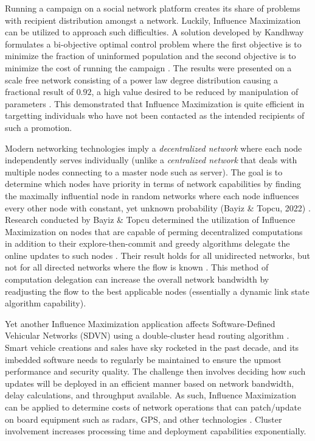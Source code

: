 \documentclass[12pt]{article}
\begin{document}
Running a campaign on a social network platform creates its share of problems with recipient distribution amongst a network. 
Luckily, Influence Maximization can be utilized to approach such difficulties. 
A solution developed by Kandhway formulates a bi-objective optimal control problem where the first objective is to minimize the fraction of uninformed population and the second objective is to minimize the cost of running the campaign \cite{10035644}. 
The results were presented on a scale free network consisting of a power law degree distribution causing a fractional result of $0.92$, a high value desired to be reduced by manipulation of parameters \cite{10035644}. 
This demonstrated that Influence Maximization is quite efficient in targetting individuals who have not been contacted as the intended recipients of such a promotion.

Modern networking technologies imply a \emph{decentralized network} where each node independently serves individually (unlike a \emph{centralized network} that deals with multiple nodes connecting to a master node such as server). 
The goal is to determine which nodes have priority in terms of network capabilities by finding the maximally influential node in random networks where each node influences every other node with constant, yet unknown probability (Bayiz \& Topcu, 2022) \cite{9929315}. 
Research conducted by Bayiz \& Topcu determined the utilization of Influence Maximization on nodes that are capable of perming decentralized computations in addition to their explore-then-commit and greedy algorithms delegate the online updates to such nodes \cite{9929315}. 
Their result holds for all unidirected networks, but not for all directed networks where the flow is known \cite{9929315}. 
This method of computation delegation can increase the overall network bandwidth by readjusting the flow to the best applicable nodes (essentially a dynamic link state algorithm capability).

Yet another Influence Maximization application affects Software-Defined Vehicular Networks (SDVN) using a double-cluster head routing algorithm \cite{8855546}. 
Smart vehicle creations and sales have sky rocketed in the past decade, and its imbedded software needs to regularly be maintained to ensure the upmost performance and security quality. 
The challenge then involves deciding how such updates will be deployed in an efficient manner based on network bandwidth, delay calculations, and throughput available. 
As such, Influence Maximization can be applied to determine costs of network operations that can patch/update on board equipment such as radars, GPS, and other technologies \cite{8855546}. 
Cluster involvement increases processing time and deployment capabilities exponentially.
\end{document}

